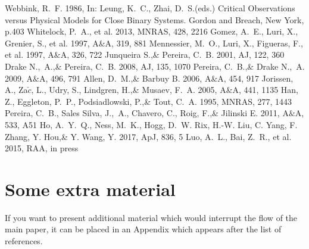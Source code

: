 \documentclass[a4paper,fleqn,usenatbib]{mnras}
\begin{document}
\begin{thebibliography}{99}
Webbink, R.~F. 1986, 
In: Leung, K.~C., Zhai, D.~S.(eds.) Critical Observations versus Physical Models for Close Binary Systems. Gordon and Breach, New York, p.403
Whitelock, P.~A., et al. 2013, 
MNRAS, 428, 2216
Gomez, A.~E., Luri, X., Grenier, S., et al. 1997, 
A$\&$A, 319, 881
Mennessier, M.~O., Luri, X., Figueras, F., et al. 1997, 
A$\&$A, 326, 722
Junqueira S.,\& Pereira, C.~B. 2001, 
AJ, 122, 360
Drake N.,~A.,\& Pereira, C.~B. 2008, 
AJ, 135, 1070
Pereira, C.~B.,\& Drake N.,~A. 2009, 
A$\&$A, 496, 791
Allen, D.~M.,\& Barbuy B. 2006, 
A$\&$A, 454, 917
Jorissen, A., Za$\check{c}$, L., Udry, S., Lindgren, H.,\& Musaev, F.~A. 2005, 
A$\&$A, 441, 1135
Han, Z., Eggleton, P.~P., Podsiadlowski, P.,\& Tout, C.~A. 1995, 
MNRAS, 277, 1443
Pereira, C.~B., Sales Silva, J.,~A., Chavero, C., Roig, F.,\& Jilinski E. 2011, 
A$\&$A, 533, A51
Ho, A.~Y.~Q., Ness, M.~K., Hogg, D.~W. Rix, H.-W. Liu, C. Yang, F. Zhang, Y. Hou,\& Y. Wang, Y. 2017, 
ApJ, 836, 5
Luo, A.~L., Bai, Z.~R., et al. 2015, 
RAA, in press






\end{thebibliography}


\appendix

\section{Some extra material}

If you want to present additional material which would interrupt the flow of the main paper,
it can be placed in an Appendix which appears after the list of references.

\bsp	%
\label{lastpage}
\end{document}
